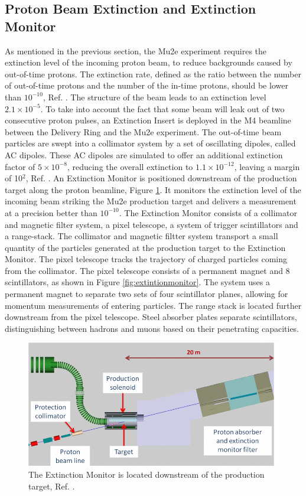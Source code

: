 \subsection{Proton Beam Extinction and Extinction Monitor}
As mentioned in the previous section, the Mu2e experiment requires the extinction level of the incoming proton beam, to reduce backgrounds caused by out-of-time protons. The extinction rate, defined as the ratio between the number of out-of-time protons and the number of the in-time protons, should be lower than $10^{-10}$, Ref. \cite{bartoszek2015mu2e}. The structure of the beam leads to an extinction level $2.1 \times 10^{-5}$. To take into account the fact that some beam will leak out of two consecutive proton pulses, an Extinction Insert is deployed in the M4 beamline between the Delivery Ring and the Mu2e experiment. The out-of-time beam particles are swept into a collimator system by a set of oscillating dipoles, called AC dipoles. These AC dipoles are simulated to offer an additional extinction factor of $5\times 10^{-8}$, reducing the overall extinction to $1.1 \times 10^{-12}$, leaving a margin of 10$^2$, Ref. \cite{accelerator}. An Extinction Monitor is positioned downstream of the production target along the proton beamline, Figure \ref{fig:extintion}. It monitors the extinction level of the incoming beam striking the Mu2e production target and delivers a measurement at a precision better than $10^{-10}$. The Extinction Monitor consists of a collimator and magnetic filter system, a pixel telescope, a system of trigger scintillators and a range-stack. The collimator and magnetic filtter system transport a small quantity of the particles generated at the production target to the Extinction Monitor. The pixel telescope tracks the trajectory of charged particles coming from the collimator. The pixel telescope consists of a permanent magnet and 8 scintillators, as shown in Figure \ref{fig:extintionmonitor}. The system uses a permanent magnet to separate two sets of four scintillator planes, allowing for momentum measurements of entering particles. The range stack is located further downstream from the pixel telescope. Steel absorber plates separate scintillators, distinguishing between hadrons and muons based on their penetrating capacities.
\begin{figure}[!h]
\centering
\includegraphics[width =\textwidth]{figures/png/800px-Extinction_filter.png}
\caption{The Extinction Monitor is located downstream of the
production target, Ref. \cite{Prebys:IPAC2015-THPF121}.}
\label{fig:extintion}
\end{figure}

